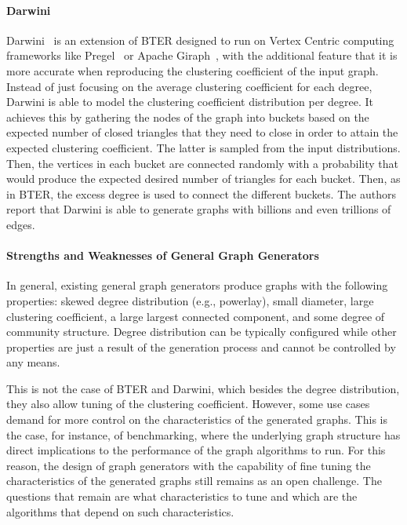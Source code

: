 \paragraph{Darwini} Darwini~\cite{edunov2016darwini} is an extension of BTER
designed to run on Vertex Centric computing frameworks like
Pregel~\cite{malewicz2010pregel} or Apache Giraph~\cite{ching2015one}, with the
additional feature that it is more accurate when reproducing the clustering
coefficient of the input graph. Instead of just focusing on the average
clustering coefficient for each degree, Darwini is able to model the clustering
coefficient distribution per degree. It achieves this by gathering the nodes
of the graph into buckets based on the expected number of closed triangles that they need
to close in order to attain the expected clustering coefficient. The latter is
sampled from the input distributions. Then, the vertices in each bucket are
connected randomly with a probability that would produce the expected
desired number of triangles for each bucket. Then, as in BTER, the excess degree
is used to connect the different buckets. The authors report that Darwini is
able to generate graphs with billions and even trillions of edges.


\paragraph{Strengths and Weaknesses of General Graph Generators}
In general, existing general graph generators produce graphs with the following
properties: skewed degree distribution (e.g., powerlay), small diameter, large
clustering coefficient, a large largest connected component, and some degree of
community structure. Degree distribution can be typically configured while other
properties are just a result of the generation process and cannot be controlled
by any means.

This is not the case of BTER and Darwini, which besides the degree distribution,
they also allow tuning of the clustering coefficient. However, some use cases
demand for more control on the characteristics of the generated graphs.
This is the case, for instance, of benchmarking, where the underlying graph
structure has direct implications to the performance of the graph algorithms
to run. For this reason, the design of graph generators with the capability of fine
tuning the characteristics of the generated graphs still remains as an open
challenge. The questions that remain are what characteristics to tune
and which are the algorithms that depend on such characteristics.
